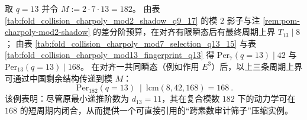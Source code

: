 \begin{remark}[复合模数下的周期坍缩：\texorpdfstring{$q=13$}{q=13} 在模 \texorpdfstring{$182$}{182} 下的最终周期上界]\label{rem:pom-mod182-period-collapse-q13}
取 \(q=13\) 并令 \(M:=2\cdot 7\cdot 13=182\)。
由表 \ref{tab:fold_collision_charpoly_mod2_shadow_q9_17} 的模 \(2\) 影子与注 \ref{rem:pom-charpoly-mod2-shadow} 的差分阶预算，在对齐有限瞬态后有最终周期上界 \(T_{13}\mid 8\)；
由表 \ref{tab:fold_collision_charpoly_mod7_selection_q13_15} 与表 \ref{tab:fold_collision_charpoly_mod13_fingerprint_q13} 得
\(
\mathrm{Per}_7(q=13)\mid 42
\)
与
\(
\mathrm{Per}_{13}(q=13)\mid 168
\)。
在对齐一共同瞬态（例如作用 \(E^{3}\)）后，以上三条周期上界可通过中国剩余结构传递到模 \(M\)：
\[
\boxed{\ \mathrm{Per}_{182}(q=13)\ \mid\ \mathrm{lcm}(8,42,168)=168\ }.
\]
该例表明：尽管原最小递推阶数为 \(d_{13}=11\)，其在复合模数 \(182\) 下的动力学可在 \(168\) 的短周期内闭合，从而提供一个可直接引用的“跨素数审计筛子”压缩实例。
\end{remark}





